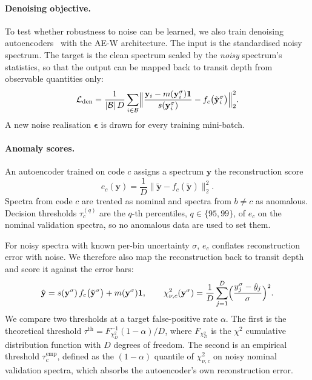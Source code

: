 \paragraph{Denoising objective.}
To test whether robustness to noise can be learned, we also train denoising autoencoders~\cite{TODO_vincent_denoising_ae} with the AE-W architecture.
The input is the standardised noisy spectrum.
The target is the clean spectrum scaled by the \emph{noisy} spectrum's statistics, so that the output can be mapped back to transit depth from observable quantities only:
\begin{equation}
  \mathcal{L}_{\mathrm{den}} = \frac{1}{|\mathcal{B}|\,D}\sum_{i\in\mathcal{B}}\Bigl\lVert \frac{\mathbf{y}_i - m(\mathbf{y}_i^{\sigma})\mathbf{1}}{s(\mathbf{y}_i^{\sigma})} - f_c\bigl(\tilde{\mathbf{y}}_i^{\sigma}\bigr)\Bigr\rVert_2^{2}.
  \label{eq:lden}
\end{equation}
A new noise realisation $\bm{\epsilon}$ is drawn for every training mini-batch.

\paragraph{Anomaly scores.}
An autoencoder trained on code $c$ assigns a spectrum $\mathbf{y}$ the reconstruction score
\begin{equation}
  e_c(\mathbf{y}) = \frac{1}{D}\bigl\lVert\tilde{\mathbf{y}} - f_c(\tilde{\mathbf{y}})\bigr\rVert_2^{2}.
  \label{eq:score}
\end{equation}
Spectra from code $c$ are treated as nominal and spectra from $b\neq c$ as anomalous.
Decision thresholds $\tau_c^{(q)}$ are the $q$-th percentiles, $q\in\{95,99\}$, of $e_c$ on the nominal validation spectra, so no anomalous data are used to set them.

For noisy spectra with known per-bin uncertainty $\sigma$, $e_c$ conflates reconstruction error with noise.
We therefore also map the reconstruction back to transit depth and score it against the error bars:
\begin{equation}
  \hat{\mathbf{y}} = s(\mathbf{y}^{\sigma})\,f_c\bigl(\tilde{\mathbf{y}}^{\sigma}\bigr) + m(\mathbf{y}^{\sigma})\mathbf{1},\qquad
  \chi^{2}_{\nu,c}(\mathbf{y}^{\sigma}) = \frac{1}{D}\sum_{j=1}^{D}\Bigl(\frac{y^{\sigma}_j-\hat{y}_j}{\sigma}\Bigr)^{2}.
  \label{eq:chi2}
\end{equation}
We compare two thresholds at a target false-positive rate $\alpha$.
The first is the theoretical threshold $\tau^{\mathrm{th}} = F^{-1}_{\chi^{2}_{D}}(1-\alpha)/D$, where $F_{\chi^{2}_{D}}$ is the $\chi^{2}$ cumulative distribution function with $D$ degrees of freedom.
The second is an empirical threshold $\tau^{\mathrm{emp}}_c$, defined as the $(1-\alpha)$ quantile of $\chi^{2}_{\nu,c}$ on noisy nominal validation spectra, which absorbs the autoencoder's own reconstruction error.

